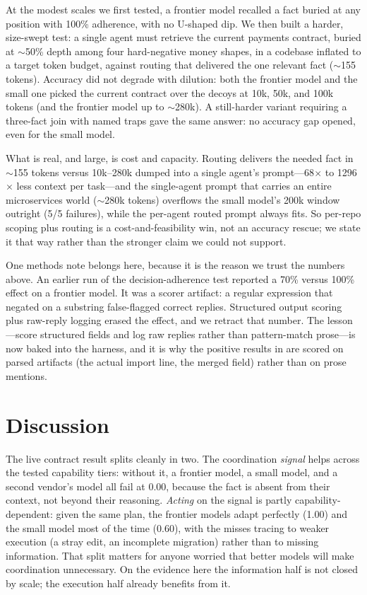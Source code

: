 At the modest scales we first tested, a frontier model recalled a fact buried at any position with
100\% adherence, with no U-shaped dip. We then built a harder, size-swept test: a single agent must
retrieve the current payments contract, buried at $\sim$50\% depth among four hard-negative money
shapes, in a codebase inflated to a target token budget, against routing that delivered the one
relevant fact ($\sim$155 tokens). Accuracy did not degrade with dilution: both the frontier model
and the small one picked the current contract over the decoys at 10k, 50k, and 100k tokens (and the
frontier model up to $\sim$280k). A still-harder variant requiring a three-fact join with named
traps gave the same answer: no accuracy gap opened, even for the small model.

What is real, and large, is cost and capacity. Routing delivers the needed fact in $\sim$155 tokens
versus 10k--280k dumped into a single agent's prompt---68$\times$ to 1296$\times$ less context per
task---and the single-agent prompt that carries an entire microservices world ($\sim$280k tokens)
overflows the small model's 200k window outright (5/5 failures), while the per-agent routed prompt
always fits. So per-repo scoping plus routing is a cost-and-feasibility win, not an accuracy rescue;
we state it that way rather than the stronger claim we could not support.

One methods note belongs here, because it is the reason we trust the numbers above. An earlier run of
the decision-adherence test reported a 70\% versus 100\% effect on a frontier model. It was a scorer
artifact: a regular expression that negated on a substring false-flagged correct replies. Structured
output scoring plus raw-reply logging erased the effect, and we retract that number. The lesson---score
structured fields and log raw replies rather than pattern-match prose---is now baked into the harness,
and it is why the positive results in  are scored on parsed artifacts (the actual
import line, the merged field) rather than on prose mentions.

\section{Discussion}
\label{sec:discussion}

The live contract result splits cleanly in two. The coordination \emph{signal}
helps across the tested capability tiers: without it, a frontier model, a small model, and a second
vendor's model all fail at 0.00, because the fact is absent from their context, not beyond their reasoning.
\emph{Acting} on the signal is partly capability-dependent: given the same plan, the frontier models
adapt perfectly (1.00) and the small model most of the time (0.60), with the misses tracing to
weaker execution (a stray edit, an incomplete migration) rather than to missing information. That
split matters for anyone worried that better models will make coordination unnecessary. On the
evidence here the information half is not closed by scale; the execution half already benefits from it.

